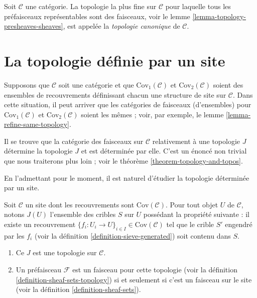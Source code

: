 \begin{definition}
\label{definition-canonical-topology}
Soit $\mathcal{C}$ une catégorie.
La topologie la plus fine sur $\mathcal{C}$ pour laquelle
tous les préfaisceaux représentables sont des faisceaux, voir le
lemme \ref{lemma-topology-presheaves-sheaves},
est appelée la {\it topologie canonique} de $\mathcal{C}$.
\end{definition}














\section{La topologie définie par un site}
\label{section-topology-site}

\noindent
Supposons que $\mathcal{C}$ soit une catégorie et que
$\text{Cov}_1(\mathcal{C})$ et $\text{Cov}_2(\mathcal{C})$
soient des ensembles de recouvrements définissant chacun une structure de site
sur $\mathcal{C}$. Dans cette situation, il peut arriver que
les catégories de faisceaux (d'ensembles) pour $\text{Cov}_1(\mathcal{C})$
et $\text{Cov}_2(\mathcal{C})$ soient les mêmes ; voir, par exemple, le
lemme \ref{lemma-refine-same-topology}.

\medskip\noindent
Il se trouve que la catégorie des faisceaux sur $\mathcal{C}$
relativement à une topologie $J$
détermine la topologie $J$ et est déterminée par elle.
C'est un énoncé non trivial que nous traiterons plus loin ;
voir le théorème \ref{theorem-topology-and-topos}.

\medskip\noindent
En l'admettant pour le moment, il est naturel d'étudier la
topologie déterminée par un site.

\begin{lemma}
\label{lemma-site-gives-topology}
Soit $\mathcal{C}$ un site dont les recouvrements sont $\text{Cov}(\mathcal{C})$.
Pour tout objet $U$ de $\mathcal{C}$, notons $J(U)$
l'ensemble des cribles $S$ sur $U$ possédant la propriété suivante :
il existe un recouvrement
$\{f_i : U_i \to U\}_{i\in I} \in \text{Cov}(\mathcal{C})$
tel que le crible $S'$ engendré par les $f_i$ (voir la définition
\ref{definition-sieve-generated}) soit contenu dans $S$.
\begin{enumerate}
\item Ce $J$ est une topologie sur $\mathcal{C}$.
\item Un préfaisceau $\mathcal{F}$ est un faisceau pour cette topologie
(voir la définition \ref{definition-sheaf-sets-topology})
si et seulement si c'est un faisceau sur le site (voir la
définition \ref{definition-sheaf-sets}).
\end{enumerate}
\end{lemma}

